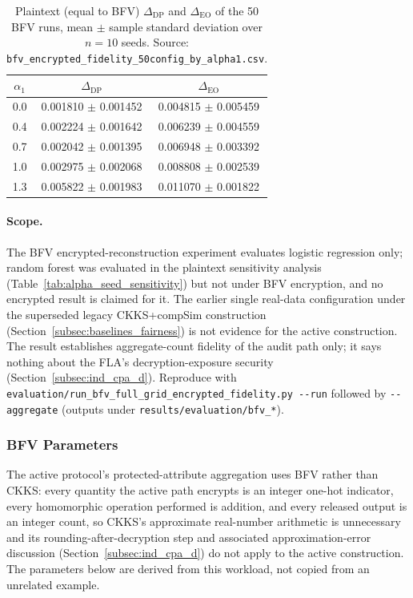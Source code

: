 \documentclass[a4paper,fleqn]{cas-dc}
\begin{document}
\begin{table}[htbp]
\centering
\caption{Plaintext (equal to BFV) $\Delta_{\mathrm{DP}}$ and $\Delta_{\mathrm{EO}}$ of the 50 BFV runs, mean $\pm$ sample standard deviation over $n=10$ seeds. Source: \texttt{bfv\_encrypted\_fidelity\_50config\_by\_alpha1.csv}.}
\label{tab:bfv_realdata_gaps}
\scriptsize
\begin{tabular}{|c|c|c|}
\hline
$\alpha_1$ & $\Delta_{\mathrm{DP}}$ & $\Delta_{\mathrm{EO}}$ \\
\hline
0.0 & 0.001810 $\pm$ 0.001452 & 0.004815 $\pm$ 0.005459 \\
0.4 & 0.002224 $\pm$ 0.001642 & 0.006239 $\pm$ 0.004559 \\
0.7 & 0.002042 $\pm$ 0.001395 & 0.006948 $\pm$ 0.003392 \\
1.0 & 0.002975 $\pm$ 0.002068 & 0.008808 $\pm$ 0.002539 \\
1.3 & 0.005822 $\pm$ 0.001983 & 0.011070 $\pm$ 0.001822 \\
\hline
\end{tabular}
\end{table}

\paragraph{Scope.} The BFV encrypted-reconstruction experiment evaluates logistic regression only; random forest was evaluated in the plaintext sensitivity analysis (Table~\ref{tab:alpha_seed_sensitivity}) but not under BFV encryption, and no encrypted result is claimed for it. The earlier single real-data configuration under the superseded legacy CKKS+compSim construction (Section~\ref{subsec:baselines_fairness}) is not evidence for the active construction. The result establishes aggregate-count fidelity of the audit path only; it says nothing about the FLA's decryption-exposure security (Section~\ref{subsec:ind_cpa_d}). Reproduce with \texttt{evaluation/run\_bfv\_full\_grid\_encrypted\_fidelity.py -\/-run} followed by \texttt{-\/-aggregate} (outputs under \texttt{results/evaluation/bfv\_*}).

\subsubsection{BFV Parameters} \label{subsec:bfv_parameters}

The active protocol's protected-attribute aggregation uses BFV rather than CKKS: every quantity the active path encrypts is an integer one-hot indicator, every homomorphic operation performed is addition, and every released output is an integer count, so CKKS's approximate real-number arithmetic is unnecessary and its rounding-after-decryption step and associated approximation-error discussion (Section~\ref{subsec:ind_cpa_d}) do not apply to the active construction. The parameters below are derived from this workload, not copied from an unrelated example.
\end{document}
